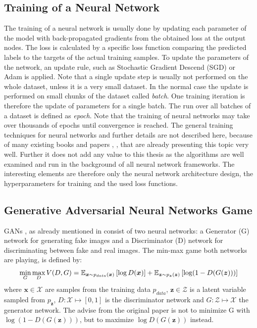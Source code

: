 
\subsection{Training of a Neural Network}
The training of a neural network is usually done by updating each parameter of the model with back-propagated gradients from the obtained loss at the output nodes.
The loss is calculated by a specific loss function comparing the predicted labels to the targets of the actual training samples.
To update the parameters of the network, an update rule, such as Stochastic Gradient Descend (SGD) or Adam \cite{Kingma2015} is applied.
Note that a single update step is usually not performed on the whole dataset, unless it is a very small dataset. 
In the normal case the update is performed on small chunks of the dataset called \emph{batch}.
One training iteration is therefore the update of parameters for a single batch.
The run over all batches of a dataset is defined as \emph{epoch}.
Note that the training of neural networks may take over thousands of epochs until convergence is reached.
The general training techniques for neural networks and further details are not described here, because of many existing books and papers \cite{LeCun2006}, \cite{Goodfellow2016}, \cite{DeepLearning} that are already presenting this topic very well. 
Further it does not add any value to this thesis as the algorithms are well examined and run in the background of all neural network frameworks.
The interesting elements are therefore only the neural network architecture design, the hyperparameters for training and the used loss functions.



\subsection{Generative Adversarial Neural Networks Game}\label{sec:nn_theory_gan}
GANs \cite{Goodfellow2014}, as already mentioned in  consist of two neural networks: a Generator (G) network for generating fake images and a Discriminator (D) network for discriminating between fake and real images.
The min-max game both networks are playing, is defined by:
\begin{equation}\label{eq:nn_theory_gan}
  \underset{G}{\min} \, \underset{D}{\max} \, V(D, G) = \mathbb{E}_{\bm{x} \sim p_{data}(\bm{x})}\left[ \log D(\bm{x}) \right] + 
    \mathbb{E}_{\bm{z} \sim p_{\bm{z}}(\bm{z})}\left[ \log (1 - D(G(\bm{z}))) \right]
\end{equation}
where $\bm{x} \in \mathcal{X}$ are samples from the training data $p_{data}$, $\bm{z} \in \mathcal{Z}$ is a latent variable sampled from $p_{\bm{z}}$, $D: \mathcal{X} \mapsto [0, 1]$ is the discriminator network and $G: \mathcal{Z} \mapsto \mathcal{X}$ the generator network.
The advise from the original paper is not to minimize G with $\log (1 - D(G(\bm{z})))$, but to maximize $\log D(G(\bm{z}))$ instead.